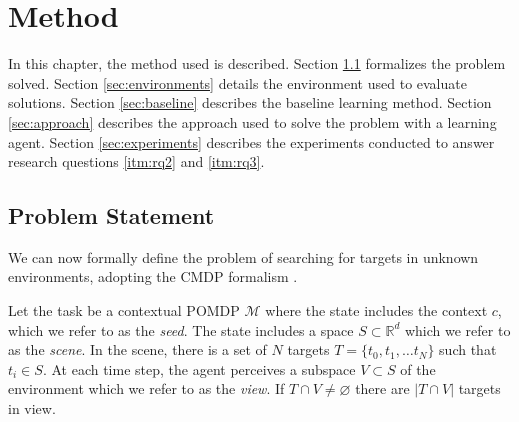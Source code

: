 \chapter{Method}
\label{cha:method}


% 

In this chapter, the method used is described.
Section \ref{sec:problem} formalizes the problem solved.
Section \ref{sec:environments} details the environment used to evaluate solutions.
Section \ref{sec:baseline} describes the baseline learning method.
Section \ref{sec:approach} describes the approach used to solve the problem with a learning agent.
Section \ref{sec:experiments} describes the experiments conducted to answer research questions \ref{itm:rq2} and \ref{itm:rq3}.

\section{Problem Statement}
\label{sec:problem}


We can now formally define the problem of searching for targets in unknown environments,
adopting the CMDP formalism \cite{kirk_survey_2022}.

Let the task be a contextual POMDP \(\mathcal{M}\) where the state includes the context \(c\), which we refer to as the \textit{seed}.
The state includes a space \(S \subset \mathbb{R}^d\) which we refer to as the \textit{scene}.
In the scene, there is a set of \(N\) targets \(T = \{t_0, t_1, \dots t_N\}\) such that \(t_i \in S\).
At each time step, the agent perceives a subspace \(V \subset S\) of the environment which we refer to as the \textit{view}.
If \(T \cap V \neq \varnothing\) there are \(\left\lvert T \cap V \right\rvert\) targets in view.

